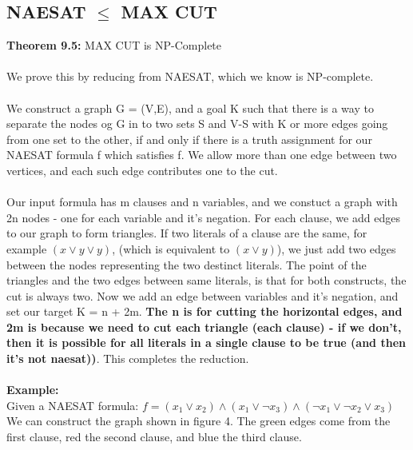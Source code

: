 \documentclass{article}
\begin{document}
\subsection{NAESAT $\le$ MAX CUT}
\textbf{Theorem 9.5:} MAX CUT is NP-Complete\\\\
We prove this by reducing from NAESAT, which we know is NP-complete.\\\\
We construct a graph G = (V,E), and a goal K such that there is a way to separate the nodes og G in to two sets S and V-S with K or more edges  going from one set to the other, if and only if there is a truth assignment for our NAESAT formula f which satisfies f. We allow more than one edge between two vertices, and each such edge contributes one to the cut. 
\\\\
Our input formula has m clauses and n variables, and we constuct a graph with 2n nodes - one for each variable and it's negation. For each clause, we add edges to our graph to form triangles. If two literals of a clause are the same, for example $(x \lor y \lor y)$, (which is equivalent to $(x \lor y)$), we just add two edges between the nodes representing the two destinct literals. The point of the triangles and the two edges between same literals, is that for both constructs, the cut is always two. Now we add an edge between variables and it's negation, and set our target K = n + 2m. \textbf{The n is for cutting the horizontal edges, and 2m is because we need to cut each triangle (each clause) - if we don't, then it is possible for all literals in a single clause to be true (and then it's not naesat))}. This completes the reduction.\\\\
\textbf{Example:}\\
Given a NAESAT formula:  $f =  (x_1 \lor x_2) \land (x_1 \lor \lnot x_3) \land (\lnot x_1 \lor \lnot x_2 \lor x_3)$\\
We can construct the graph shown in figure 4. The green edges come from the first clause, red the second clause, and blue the third clause.\\
\end{document}
